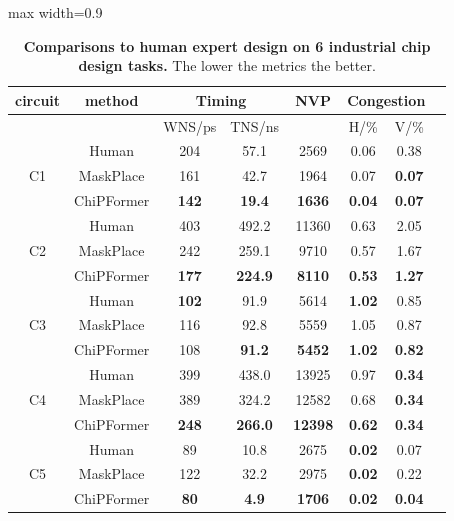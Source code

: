 \documentclass{article}
\theoremstyle{plain}
\theoremstyle{definition}
\theoremstyle{remark}
\begin{document}
\begin{table}[!htb]
\caption{
\textbf{Comparisons to human expert design on 6 industrial chip design tasks.} The lower the metrics the better.
}
\label{real-world}
    \centering
    \begin{adjustbox}{max width=0.9\columnwidth}
    \begin{threeparttable}
    
    \begin{tabular}{cccccccc}
    \toprule
        circuit & method & \multicolumn{2}{c}{Timing} & NVP\tnote{1} & \multicolumn{2}{c}{Congestion}   \\ 
    \midrule
        ~ & ~ & WNS/ps & TNS/ns & ~ & H/\% & V/\%  \\ \midrule
    
        \multirow{3}{*}{C1} & Human & 204 & 57.1 & 2569 & 0.06 & 0.38  \\  
       ~ & MaskPlace & 161 & 42.7 & 1964 & 0.07 & \textbf{0.07} \\
        ~ & ChiPFormer & \textbf{142} & \textbf{19.4} & \textbf{1636} & \textbf{0.04} & \textbf{0.07}  \\  \midrule
         \multirow{3}{*}{C2} & Human & 403 & 492.2 & 11360 & 0.63 & 2.05  \\ 
         ~ & MaskPlace & 242 & 259.1 & 9710 & 0.57 & 1.67 \\
        ~ & ChiPFormer & \textbf{177} & \textbf{224.9} & \textbf{8110} & \textbf{0.53} & \textbf{1.27}  \\ \midrule
         \multirow{3}{*}{C3} & Human & \textbf{102} & 91.9 & 5614 & \textbf{1.02} & 0.85  \\ 
         ~ & MaskPlace & 116 & 92.8 & 5559 & 1.05 & 0.87 \\
        ~ & ChiPFormer & 108 & \textbf{91.2} & \textbf{5452} & \textbf{1.02} & \textbf{0.82}  \\ \midrule
         \multirow{3}{*}{C4} & Human & 399 & 438.0 & 13925 & 0.97 & \textbf{0.34}  \\ 
         ~ & MaskPlace & 389 & 324.2 &12582 & 0.68 & \textbf{0.34}\\
        ~ & ChiPFormer & \textbf{248} & \textbf{266.0} & \textbf{12398} & \textbf{0.62} & \textbf{0.34}  \\ \midrule
        \multirow{3}{*}{C5} & Human & 89 & 10.8 & 2675 & \textbf{0.02} & 0.07 \\
        ~ & MaskPlace & 122 & 32.2 & 2975& \textbf{0.02} & 0.22 \\
        ~ & ChiPFormer & \textbf{80} & \textbf{4.9} & \textbf{1706} & \textbf{0.02} & \textbf{0.04} \\  \midrule

\end{tabular}
\end{threeparttable}
\end{adjustbox}
\end{table}
\end{document}

